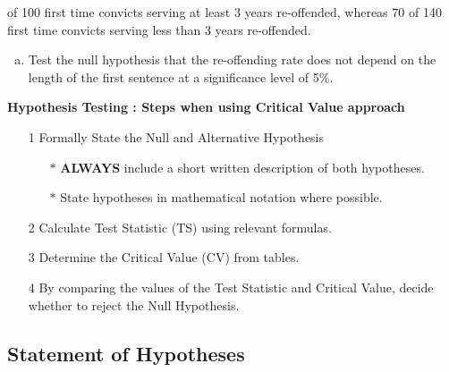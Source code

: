 \documentclass[a4paper,12pt]{article}
\begin{document}
\large 
{} of 100 first time convicts serving at least 3 years re-offended, whereas 70 of 140 first time convicts serving less than 3 years re-offended. 
\begin{enumerate}[(a)]
\item	Test the null hypothesis that the re-offending rate does not depend on the length of the first sentence at a significance level of 5\%.
\end{enumerate}

\bigskip 
\begin{framed}
		\noindent \textbf{Hypothesis Testing : Steps when using Critical Value approach}
		
		\begin{itemize}
			\item[1] Formally State the Null and Alternative Hypothesis \smallskip
			{
				\begin{itemize}
					\item[$\ast$] \textbf{ALWAYS} include a short written description of both hypotheses.
					\item[$\ast$] State hypotheses in mathematical notation where possible.
					
				\end{itemize}
			}
			\item[2] Calculate Test Statistic (TS) using relevant formulas.\smallskip
			\item[3] Determine the Critical Value (CV) from tables. \smallskip
			\item[4] By comparing the values of the Test Statistic and Critical Value, decide whether to reject the Null Hypothesis.
		\end{itemize}
	\end{framed}
\newpage 
\subsection*{Statement of Hypotheses}
\end{document}
